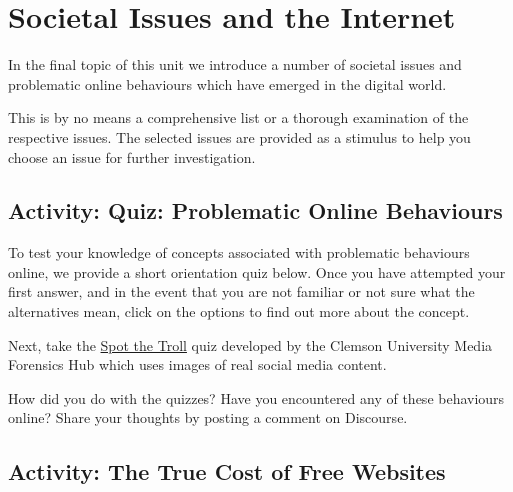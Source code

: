 \documentclass[
]{book}
\theoremstyle{definition}
\theoremstyle{definition}
\theoremstyle{definition}
\theoremstyle{definition}
\theoremstyle{remark}
\begin{document}
\hypertarget{societal-issues-and-the-internet}{%
\section{Societal Issues and the Internet}\label{societal-issues-and-the-internet}}

In the final topic of this unit we introduce a number of societal issues and problematic online behaviours which have emerged in the digital world.

This is by no means a comprehensive list or a thorough examination of the respective issues. The selected issues are provided as a stimulus to help you choose an issue for further investigation.

\hypertarget{activity-quiz-problematic-online-behaviours}{%
\subsection*{Activity: Quiz: Problematic Online Behaviours}\label{activity-quiz-problematic-online-behaviours}}

\begin{reflect}
To test your knowledge of concepts associated with problematic behaviours online, we provide a short orientation quiz below. Once you have attempted your first answer, and in the event that you are not familiar or not sure what the alternatives mean, click on the options to find out more about the concept.

Next, take the \href{https://spotthetroll.org/}{Spot the Troll} quiz developed by the Clemson University Media Forensics Hub which uses images of real social media content.

How did you do with the quizzes? Have you encountered any of these behaviours online? Share your thoughts by posting a comment on Discourse.
\end{reflect}

\hypertarget{activity-the-true-cost-of-free-websites}{%
\subsection*{Activity: The True Cost of Free Websites}\label{activity-the-true-cost-of-free-websites}}
\end{document}

